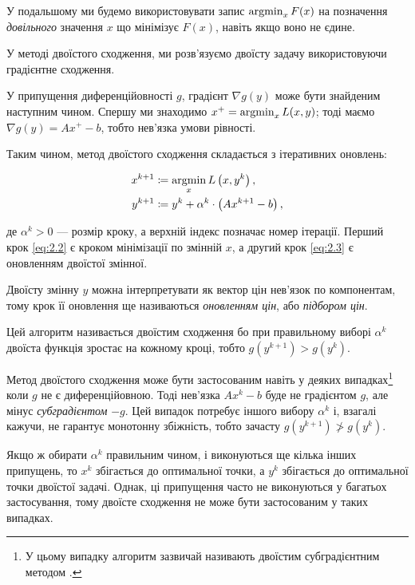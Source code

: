 \begin{definition}
    У подальшому ми будемо використовувати запис $\operatorname{argmin}_x F(x)$ на позначення \textit{довільного} значення $x$ що мінімізує $F(x)$, навіть якщо воно не єдине.
\end{definition}

У методі двоїстого сходження, ми розв'язуємо двоїсту задачу використовуючи градієнтне сходження.

\begin{remark}
    У припущення диференційовності $g$, градієнт $\nabla g(y)$ може бути знайденим наступним чином. Спершу ми знаходимо $x^+ = \operatorname{argmin}_x L(x,y)$; тоді маємо $\nabla g(y) = Ax^+ - b$, тобто нев'язка умови рівності.
\end{remark}

Таким чином, метод двоїстого сходження складається з ітеративних оновлень:

\begin{align}
	\label{eq:2.2}
	x^{k + 1} &\coloneqq \operatorname*{argmin}_x L \left( x, y^k \right), \\
	\label{eq:2.3}
	y^{k + 1} &\coloneqq y^k + \alpha^k \cdot \left( A x^{k + 1} - b \right),
\end{align}

де $\alpha^k > 0$ --- розмір кроку, а верхній індекс позначає номер ітерації. Перший крок \eqref{eq:2.2} є кроком мінімізації по змінній $x$, а другий крок \eqref{eq:2.3} є оновленням двоїстої змінної. 

\begin{definition}
    Двоїсту змінну $y$ можна інтерпретувати як вектор цін нев'язок по компонентам, тому крок її оновлення ще називаються \textit{оновленням цін}, або \textit{підбором цін}. 
\end{definition}

Цей алгоритм називається двоїстим сходження бо при правильному виборі $\alpha^k$ двоїста функція зростає на кожному кроці, тобто $g(y^{k + 1}) > g(y^k)$. \medskip

Метод двоїстого сходження може бути застосованим навіть у деяких випадках\footnote{У цьому випадку алгоритм зазвичай називають двоїстим субградієнтним методом \cite{152}.} коли $g$ не є диференційовною. Тоді нев'язка $Ax^k - b$ буде не градієнтом $g$, але мінус \textit{субградієнтом} $-g$. Цей випадок потребує іншого вибору $\alpha^k$ і, взагалі кажучи, не гарантує монотонну збіжність, тобто зачасту $g(y^{k + 1}) \not> g (y^k)$. \medskip

Якщо ж обирати $\alpha^k$ правильним чином, і виконуються ще кілька інших припущень, то $x^k$ збігається до оптимальної точки, а $y^k$ збігається до оптимальної точки двоїстої задачі. Однак, ці припущення часто не виконуються у багатьох застосування, тому двоїсте сходження не може бути застосованим у таких випадках. 

